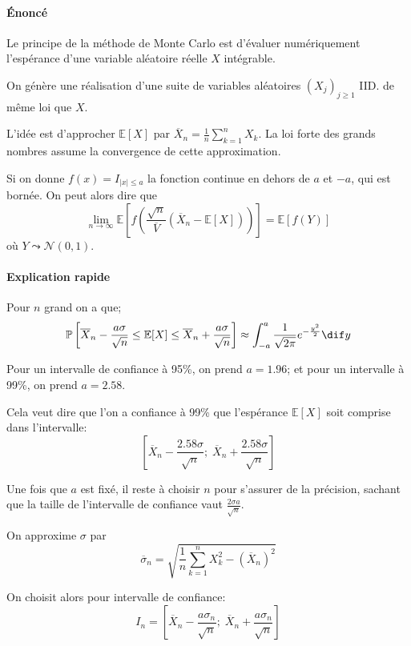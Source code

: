 \documentclass[a4paper,10pt,french,openany]{memoir}
\newcommand{\Proba}{\mathbb{P}}
\newcommand{\Esper}{\mathbb{E}}
\newcommand{\normale}{\mathcal{N}}
\newcommand{\abs}[1]{\lvert #1 \rvert}
\begin{document}
\paragraph{Énoncé}
Le principe de la méthode de Monte Carlo est d'évaluer numériquement l'espérance d'une variable aléatoire réelle $X$ intégrable.

On génère une réalisation d'une suite de variables aléatoires $(X_j)_{j\geq1}$ IID. de même loi que $X$.

L'idée est d'approcher $\Esper[X]$ par $\overline X_n = \frac1n \sum_{k=1}^n X_k$. La loi forte des grands nombres assume la convergence de cette approximation.

Si on donne $f(x)=I_{\abs x \leq a}$ la fonction continue en dehors de $a$ et $-a$, qui est bornée. On peut alors dire que \[\lim_{n\to\infty} \Esper\left[f\left(\frac{\sqrt n}{\overline V} (\overline X_n - \Esper[X])\right)\right] = \Esper[f(Y)]\]
où $Y\leadsto\normale(0,1)$.

\paragraph{Explication rapide}
Pour $n$ grand on a que; \[\Proba\left[\overline X_n - \frac{a\sigma}{\sqrt n} \leq \Esper[X] \leq \overline X_n + \frac{a\sigma}{\sqrt n}\right] \approx \int_{-a}^a \frac1{\sqrt{2\pi}} e^{-\frac{y^2}2} \dif y\]

Pour un intervalle de confiance à 95\%, on prend $a=1.96$; et pour un intervalle à 99\%, on prend $a=2.58$.

Cela veut dire que l'on a confiance à 99\% que l'espérance $\Esper[X]$ soit comprise dans l'intervalle: \[\left[ \overline X_n - \frac{2.58\sigma}{\sqrt n};\; \overline X_n + \frac{2.58\sigma}{\sqrt n} \right]\]

Une fois que $a$ est fixé, il reste à choisir $n$ pour s'assurer de la précision, sachant que la taille de l'intervalle de confiance vaut $\frac{2\sigma a}{\sqrt n}$.

On approxime $\sigma$ par \[\overline\sigma_n = \sqrt{\frac1n \sum_{k=1}^n X_k^2 - (\overline X_n)^2}\]

On choisit alors pour intervalle de confiance:
\[I_n = \left[ \overline X_n - \frac{a\sigma_n}{\sqrt n};\; \overline X_n + \frac{a\sigma_n}{\sqrt n} \right]\]
\end{document}
